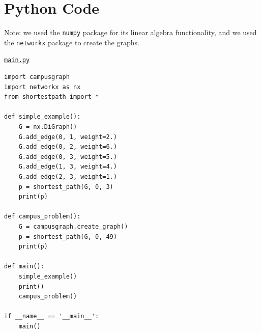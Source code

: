 \newpage
\appendix
\section{Python Code} \label{appendix:code}

Note: we used the \texttt{numpy} package for its linear algebra functionality, and we used the \texttt{networkx} package to create the graphs.

\underline{\texttt{main.py}}
\begin{verbatim}
import campusgraph
import networkx as nx
from shortestpath import *

def simple_example():
    G = nx.DiGraph()
    G.add_edge(0, 1, weight=2.)
    G.add_edge(0, 2, weight=6.)
    G.add_edge(0, 3, weight=5.)
    G.add_edge(1, 3, weight=4.)
    G.add_edge(2, 3, weight=1.)
    p = shortest_path(G, 0, 3)
    print(p)

def campus_problem():
    G = campusgraph.create_graph()
    p = shortest_path(G, 0, 49)
    print(p)

def main():
    simple_example()
    print()
    campus_problem()

if __name__ == '__main__':
    main()
\end{verbatim}

